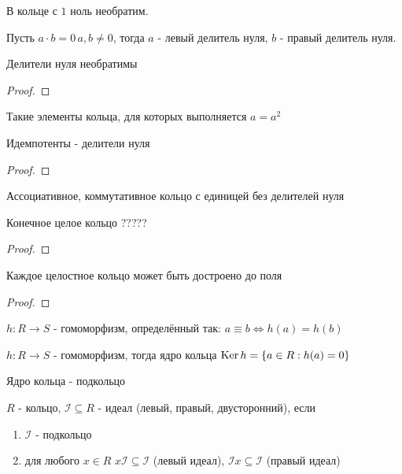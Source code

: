 \documentclass[../main/document.tex]{subfiles}
\begin{document}
\begin{cnsq}
В кольце с $1$ ноль необратим.
\end{cnsq}
\begin{dfn}
Пусть $a\cdot b=0\, a,b\neq 0$, тогда $a$ - левый делитель нуля, $b$ - правый делитель нуля.
\end{dfn}
\begin{exm}

\end{exm}
\begin{thm}
Делители нуля необратимы
\begin{proof}

\end{proof}
\end{thm}
\begin{dfn}
Такие элементы кольца, для которых выполняется $a=a^2$
\end{dfn}
\begin{thm}
Идемпотенты - делители нуля
\begin{proof}

\end{proof}
\end{thm}
\begin{dfn}
Ассоциативное, коммутативное кольцо с единицей без делителей нуля
\end{dfn}
\begin{thm}
Конечное целое кольцо ?????
\begin{proof}

\end{proof}
\end{thm}
\begin{thm}
Каждое целостное кольцо может быть достроено до поля
\begin{proof}

\end{proof}
\end{thm}
\begin{dfn}
$h:R\to S$ - гомоморфизм, определённый так: $a\equiv b\Leftrightarrow h(a)=h(b)$
\end{dfn}
\begin{dfn}
$h:R\to S$ - гомоморфизм, тогда ядро кольца $\operatorname{Ker} h=\{a\in R:h(a)=0\}$ 
\end{dfn}
\begin{thm}
Ядро кольца - подкольцо
\end{thm}
\begin{dfn}[Идеал]
$R$ - кольцо, $\mathcal{I}\subseteq R$ - идеал (левый, правый, двусторонний), если
\begin{enumerate}
\item $\mathcal{I}$ - подкольцо
\item для любого $x\in R$ $x\mathcal{I}\subseteq\mathcal{I}$ (левый идеал), $\mathcal{I} x\subseteq\mathcal{I}$ (правый идеал)
\end{enumerate}
\end{dfn}
\end{document}
